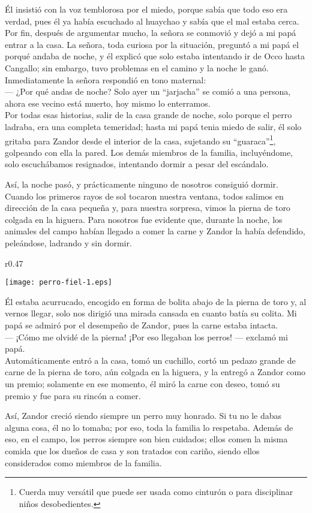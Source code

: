 Él insistió con la voz temblorosa por el miedo, porque sabía que todo eso era verdad, pues él ya había escuchado al huaychao y sabía que el mal estaba cerca. Por fin, después de argumentar mucho, la señora se conmovió y dejó a mi papá entrar a la casa.
La señora, toda curiosa por la situación, preguntó a mi papá el porqué andaba de noche, y él explicó que solo estaba intentando ir de Occo hasta Cangallo; sin embargo, tuvo problemas en el camino y la noche le ganó. 
Inmediatamente la señora respondió en tono maternal:\\\indent 
--- ¿Por qué andas de noche? Solo ayer un ``jarjacha'' se comió a una persona, ahora ese vecino está muerto, hoy mismo lo enterramos.\\\indent
Por todas esas historias, salir de la casa grande de noche, solo porque el perro ladraba, era una completa temeridad; hasta mi papá tenia miedo de salir, él solo gritaba para Zandor desde el interior de la casa, sujetando su ``guaraca''\footnote{Cuerda muy versátil que puede ser usada como cinturón o para disciplinar niños desobedientes.}, golpeando con ella la pared.
Los demás miembros de la familia, incluyéndome, solo escuchábamos resignados, intentando dormir a pesar del escándalo.

Así, la noche pasó, y prácticamente ninguno de nosotros consiguió dormir. 
Cuando los primeros rayos de sol tocaron nuestra ventana, todos salimos en dirección de la casa pequeña y, para nuestra sorpresa, vimos la pierna de toro colgada en la higuera. 
Para nosotros fue evidente que, durante la noche, los animales del campo habían llegado a comer la carne y Zandor la había defendido, peleándose, ladrando y sin dormir. 
\ifdefined\EnableIncludeImages
\begin{wrapfigure}{r}{0.47\textwidth}
  \begin{center}
  \vspace{-0.5cm}
    \texttt{[image: perro-fiel-1.eps]}
  \end{center}
  \vspace{-0.5cm}
\end{wrapfigure}
\fi
Él estaba acurrucado, encogido en forma de bolita abajo de la pierna de toro y, al vernos llegar, solo nos dirigió una mirada cansada en cuanto batía su colita. Mi papá se admiró por el desempeño de Zandor, pues la carne estaba intacta.\\\indent
--- ¡Cómo me olvidé de la pierna! ¡Por eso llegaban los perros! --- exclamó mi papá.\\\indent
Automáticamente entró a la casa, tomó un cuchillo, cortó un pedazo grande de carne de la pierna de toro, aún colgada en la higuera, y la entregó a Zandor como un premio; solamente en ese momento, él miró la carne con deseo, tomó su premio y fue para su rincón a comer.

Así, Zandor creció siendo siempre un perro muy honrado. Si tu no le dabas alguna cosa, él no lo tomaba; por eso, toda la familia lo respetaba. Además de eso, en el campo, los perros siempre son bien cuidados; ellos comen la misma comida que los dueños de casa y son tratados con cariño, siendo ellos considerados como miembros de la familia.



